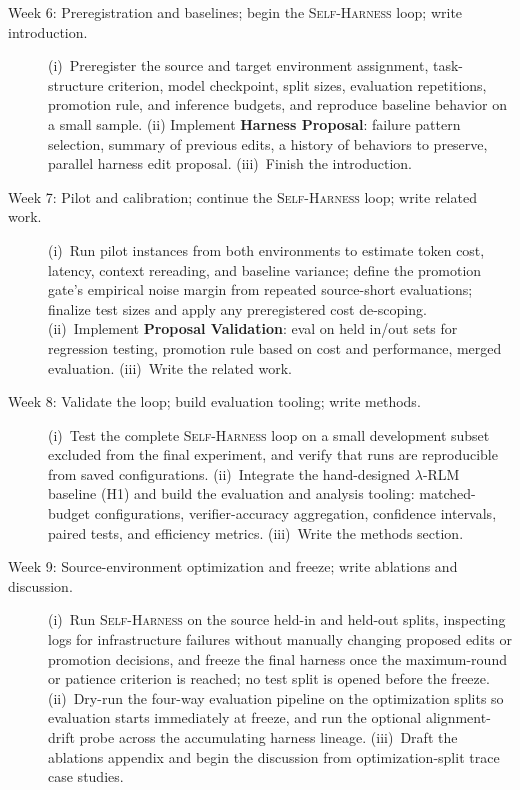 \documentclass{article}
\newcommand{\SC}[1]{\textcolor{violet}{Simon: #1}}
\newcommand{\sh}{\textsc{Self-Harness}\xspace}
\begin{document}
\begin{description}

\item[Week 6: Preregistration and baselines; begin the \sh{} loop; write introduction.]
(i)~Preregister the source and target environment assignment, task-structure criterion, model checkpoint, split sizes, evaluation repetitions, promotion rule, and inference budgets, and reproduce baseline behavior on a small sample. (ii) Implement \textbf{Harness Proposal}: failure pattern selection, summary of previous edits, a history of behaviors to preserve, parallel harness edit proposal. (iii)~Finish the introduction.


\item[Week 7: Pilot and calibration; continue the \sh{} loop; write related work.]
(i)~Run pilot instances from both environments to estimate token cost, latency, context rereading, and baseline variance; define the promotion gate's empirical noise margin from repeated source-short evaluations; finalize test sizes and apply any preregistered cost de-scoping. (ii)~Implement \textbf{Proposal Validation}: eval on held in/out sets for regression testing, promotion rule based on cost and performance, merged evaluation. (iii)~Write the related work.

\item[Week 8: Validate the loop; build evaluation tooling; write methods.]
(i)~Test the complete \sh{} loop on a small development subset excluded from the final experiment, and verify that runs are reproducible from saved configurations. (ii)~Integrate the hand-designed $\lambda$-RLM baseline (H1) and build the evaluation and analysis tooling: matched-budget configurations, verifier-accuracy aggregation, confidence intervals, paired tests, and efficiency metrics. (iii)~Write the methods section.

\item[Week 9: Source-environment optimization and freeze; write ablations and discussion.]
(i)~Run \sh{} on the source held-in and held-out splits, inspecting logs for infrastructure failures without manually changing proposed edits or promotion decisions, and freeze the final harness once the maximum-round or patience criterion is reached; no test split is opened before the freeze. (ii)~Dry-run the four-way evaluation pipeline on the optimization splits so evaluation starts immediately at freeze, and run the optional alignment-drift probe across the accumulating harness lineage. (iii)~Draft the ablations appendix and begin the discussion from optimization-split trace case studies.


\end{description}
\end{document}
